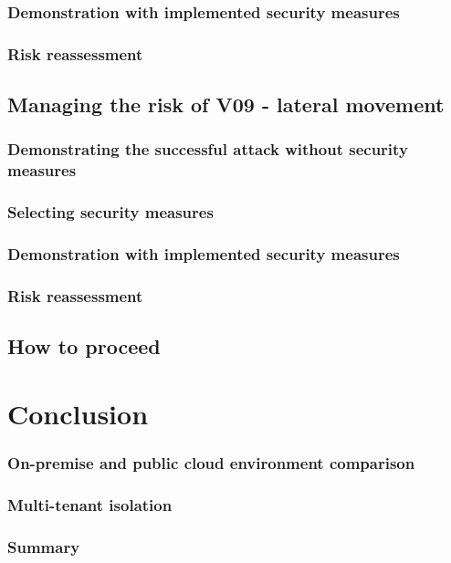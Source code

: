 \subsection{Demonstration with implemented security measures}

\subsection{Risk reassessment}

\section{Managing the risk of V09 - lateral movement}

\subsection{Demonstrating the successful attack without security measures}

\subsection{Selecting security measures}

\subsection{Demonstration with implemented security measures}

\subsection{Risk reassessment}

\section{How to proceed}

\chapter{Conclusion}

\subsection{On-premise and public cloud environment comparison}


\subsection{Multi-tenant isolation}

\subsection{Summary}


